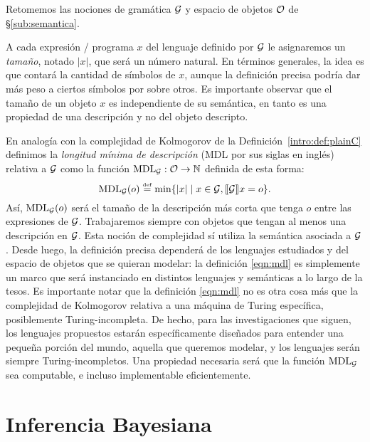 Retomemos las nociones de gramática $\gram$ y espacio de objetos $\+O$ de \S\ref{sub:semantica}. 

A cada expresión / programa $x$ del lenguaje definido por $\gram$ le asignaremos un {\em tamaño}, notado $|x|$, que será un número natural. En términos generales, la idea es que contará la cantidad de símbolos de $x$, aunque la definición precisa podría dar más peso a ciertos símbolos por sobre otros. Es importante observar que el tamaño de un objeto $x$ es independiente de su semántica, en tanto es una propiedad de una descripción y no del objeto descripto.

En analogía con la complejidad de Kolmogorov de la Definición~\ref{intro:def:plainC} definimos la {\em longitud mínima de descripción} (MDL por sus siglas en inglés) relativa a $\gram$ como la función $\mdl{\gram}:\+O\to\nat$ definida de esta forma:
%
\begin{equation}\label{eqn:mdl}
\mdl{\gram}(o)\eqdef\min\{|x|\mid x\in\gram,\sem{\gram}{x}=o\}.
\end{equation}
%
Así, $\mdl{\gram}(o)$ será el tamaño de la descripción más corta que tenga $o$ entre las expresiones de $\gram$. Trabajaremos siempre con objetos que tengan al menos una descripción en $\gram$. Esta noción de complejidad sí utiliza la semántica asociada a $\gram$. Desde luego, la definición precisa dependerá de los lenguajes estudiados y del espacio de objetos que se quieran modelar: la definición \eqref{eqn:mdl} es simplemente un marco que será instanciado en distintos lenguajes y semánticas a lo largo de la tesos. Es importante notar que la definición \eqref{eqn:mdl} no es otra cosa más que la complejidad de Kolmogorov relativa a una máquina de Turing específica, posiblemente Turing-incompleta. De hecho, para las investigaciones que siguen, los lenguajes propuestos estarán específicamente diseñados para entender una pequeña porción del mundo, aquella que queremos modelar, y los lenguajes serán siempre Turing-incompletos. Una propiedad necesaria será que la función $\mdl{\gram}$ sea computable, e incluso implementable eficientemente.





\section{Inferencia Bayesiana}
 



